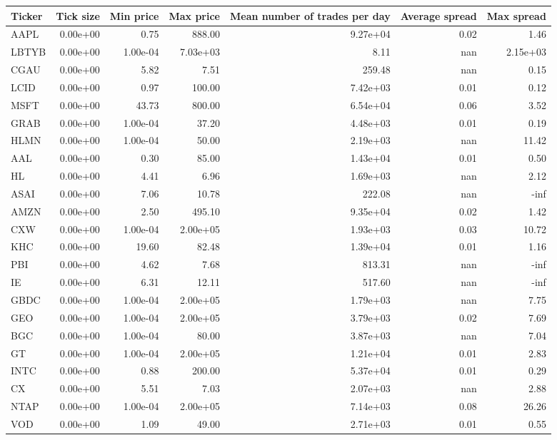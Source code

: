\begin{table}[H]
\centering
\small
\begin{tabular}{lrrrrrr}
\toprule
Ticker & Tick size & Min price & Max price & Mean number of trades per day & Average spread & Max spread \\
\midrule
AAPL & 0.00e+00 & 0.75 & 888.00 & 9.27e+04 & 0.02 & 1.46 \\
LBTYB & 0.00e+00 & 1.00e-04 & 7.03e+03 & 8.11 & nan & 2.15e+03 \\
CGAU & 0.00e+00 & 5.82 & 7.51 & 259.48 & nan & 0.15 \\
LCID & 0.00e+00 & 0.97 & 100.00 & 7.42e+03 & 0.01 & 0.12 \\
MSFT & 0.00e+00 & 43.73 & 800.00 & 6.54e+04 & 0.06 & 3.52 \\
GRAB & 0.00e+00 & 1.00e-04 & 37.20 & 4.48e+03 & 0.01 & 0.19 \\
HLMN & 0.00e+00 & 1.00e-04 & 50.00 & 2.19e+03 & nan & 11.42 \\
AAL & 0.00e+00 & 0.30 & 85.00 & 1.43e+04 & 0.01 & 0.50 \\
HL & 0.00e+00 & 4.41 & 6.96 & 1.69e+03 & nan & 2.12 \\
ASAI & 0.00e+00 & 7.06 & 10.78 & 222.08 & nan & -inf \\
AMZN & 0.00e+00 & 2.50 & 495.10 & 9.35e+04 & 0.02 & 1.42 \\
CXW & 0.00e+00 & 1.00e-04 & 2.00e+05 & 1.93e+03 & 0.03 & 10.72 \\
KHC & 0.00e+00 & 19.60 & 82.48 & 1.39e+04 & 0.01 & 1.16 \\
PBI & 0.00e+00 & 4.62 & 7.68 & 813.31 & nan & -inf \\
IE & 0.00e+00 & 6.31 & 12.11 & 517.60 & nan & -inf \\
GBDC & 0.00e+00 & 1.00e-04 & 2.00e+05 & 1.79e+03 & nan & 7.75 \\
GEO & 0.00e+00 & 1.00e-04 & 2.00e+05 & 3.79e+03 & 0.02 & 7.69 \\
BGC & 0.00e+00 & 1.00e-04 & 80.00 & 3.87e+03 & nan & 7.04 \\
GT & 0.00e+00 & 1.00e-04 & 2.00e+05 & 1.21e+04 & 0.01 & 2.83 \\
INTC & 0.00e+00 & 0.88 & 200.00 & 5.37e+04 & 0.01 & 0.29 \\
CX & 0.00e+00 & 5.51 & 7.03 & 2.07e+03 & nan & 2.88 \\
NTAP & 0.00e+00 & 1.00e-04 & 2.00e+05 & 7.14e+03 & 0.08 & 26.26 \\
VOD & 0.00e+00 & 1.09 & 49.00 & 2.71e+03 & 0.01 & 0.55 \\

\end{tabular}
\end{table}
